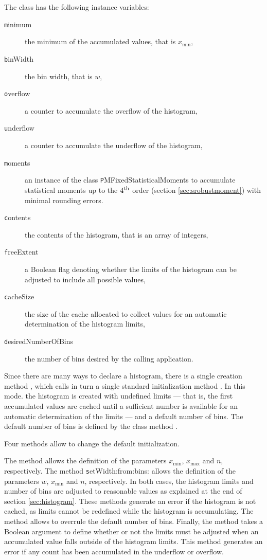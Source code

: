 \noindent The class  has the following instance variables:
\begin{description}
  \item[\texttt minimum] the minimum of the accumulated values, that
  is $x_{\min}$,
  \item[\texttt binWidth] the bin width, that is $w$,
  \item[\texttt overflow] a counter to accumulate the overflow of the histogram,
  \item[\texttt underflow] a counter to accumulate the underflow of the histogram,
  \item[\texttt moments] an instance of the class {\texttt
  PMFixedStatisticalMoments} to accumulate statistical moments up
  to the $4^{\mathop{\textrm{th}}}$ order (\cf section \ref{sec:srobustmoment}) with
  minimal rounding errors.
  \item[\texttt contents] the contents of the histogram, that is an
  array of integers,
  \item[\texttt freeExtent] a Boolean flag denoting whether the limits
  of the histogram can be adjusted to include all possible values,
  \item[\texttt cacheSize] the size of the cache allocated to collect
  values for an automatic determination of the histogram limits,
  \item[\texttt desiredNumberOfBins] the number of bins desired by the
  calling application.
\end{description}

Since there are many ways to declare a histogram, there is a
single creation method , which calls in turn a single
standard initialization method . In this mode. the
histogram is created with undefined limits --- that is, the first
accumulated values are cached until a sufficient number is
available for an automatic determination of the limits --- and a
default number of bins.
The default number of bins is defined by
the class method .

\noindent Four methods allow to change the default initialization.

The method  allows the definition of
the parameters $x_{\min}$, $x_{\max}$ and $n$, respectively. The
method {\texttt setWidth:from:bins:} allows the definition of the
parameters $w$, $x_{\min}$ and $n$, respectively. In both cases,
the histogram limits and number of bins are adjusted to reasonable
values as explained at the end of section \ref{sec:histogram}.
These methods generate an error if the histogram is not cached, as
limits cannot be redefined while the histogram is accumulating.
The method  allows to overrule the
default number of bins. Finally, the method 
takes a Boolean argument to define whether or not the limits must
be adjusted when an accumulated value falls outside of the
histogram limits. This method generates an error if any count has
been accumulated in the underflow or overflow.

